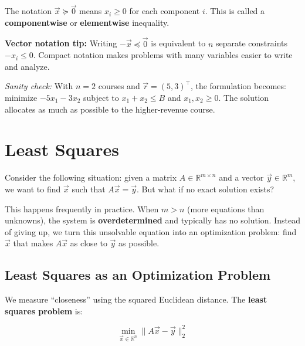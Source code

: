 \documentclass[10pt, twocolumn]{article}
\theoremstyle{definition}
\theoremstyle{plain}
\newcommand{\RR}{\mathbb{R}}
\begin{document}
The notation $\vec{x} \succeq \vec{0}$ means $x_i \ge 0$ for each component $i$. This is called a \textbf{componentwise} or \textbf{elementwise} inequality.

\begin{tcolorbox}[colframe=black!50]
\textbf{Vector notation tip:} Writing $-\vec{x} \preceq \vec{0}$ is equivalent to $n$ separate constraints $-x_i \le 0$. Compact notation makes problems with many variables easier to write and analyze.
\end{tcolorbox}

\textit{Sanity check:} With $n = 2$ courses and $\vec{r} = (5, 3)^\top$, the formulation becomes: minimize $-5x_1 - 3x_2$ subject to $x_1 + x_2 \le B$ and $x_1, x_2 \ge 0$. The solution allocates as much as possible to the higher-revenue course. \checkmark

\section{Least Squares}

Consider the following situation: given a matrix $A \in \RR^{m \times n}$ and a vector $\vec{y} \in \RR^m$, we want to find $\vec{x}$ such that $A\vec{x} = \vec{y}$. But what if no exact solution exists?

This happens frequently in practice. When $m > n$ (more equations than unknowns), the system is \textbf{overdetermined} and typically has no solution. Instead of giving up, we turn this unsolvable equation into an optimization problem: find $\vec{x}$ that makes $A\vec{x}$ as close to $\vec{y}$ as possible.

\subsection{Least Squares as an Optimization Problem}

We measure ``closeness'' using the squared Euclidean distance. The \textbf{least squares problem} is:

\begin{result}
\[
    \min_{\vec{x} \in \RR^n} \|A\vec{x} - \vec{y}\|_2^2
\]
\end{result}
\end{document}
